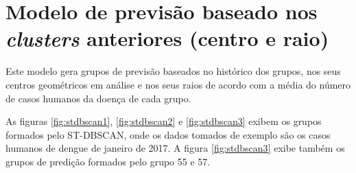 \section{Modelo de previsão baseado nos \emph{clusters} anteriores (centro e raio)}

Este modelo gera grupos de previsão baseados no histórico dos grupos, nos seus centros geométricos em análise e nos seus raios de acordo com a média do número de casos humanos da doença de cada grupo.

As figuras \ref{fig:stdbscan1}, \ref{fig:stdbscan2} e \ref{fig:stdbscan3} exibem os grupos formados pelo \acrshort{ST-DBSCAN}, onde os dados tomados de exemplo são os casos humanos de dengue de janeiro de 2017. A figura \ref{fig:stdbscan3} exibe também os grupos de predição formados pelo grupo 55 e 57.

\begin{figure}[!ht]
	\centering	
\end{figure}
\FloatBarrier

\begin{figure}[!ht]
	\centering	
\end{figure}
\FloatBarrier

